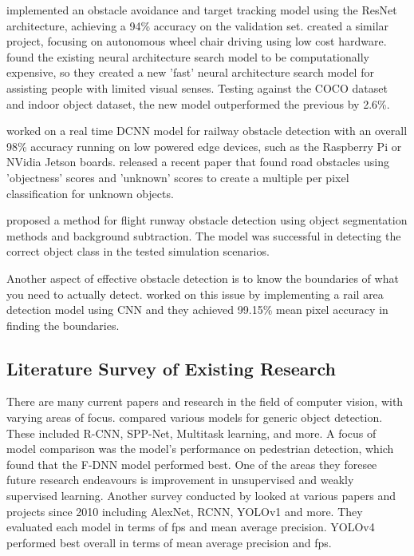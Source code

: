 \documentclass[stu,12pt,floatsintext]{apa7}
\begin{document}
\textcite{fang_computer_2021} implemented an obstacle avoidance and target tracking model using the ResNet architecture, achieving a 94\% accuracy on the validation set. \textcite{farheen_object_2022} created a similar project, focusing on autonomous wheel chair driving using low cost hardware. \textcite{said_obstacle_2023} found the existing neural architecture search model to be computationally expensive, so they created a new 'fast' neural architecture search model for assisting people with limited visual senses. Testing against the COCO dataset and indoor object dataset, the new model outperformed the previous by 2.6\%.

\textcite{jenefa_real-time_2023} worked on a real time DCNN model for railway obstacle detection with an overall 98\% accuracy running on low powered edge devices, such as the Raspberry Pi or NVidia Jetson boards. \textcite{noguchi_road_2024} released a recent paper that found road obstacles using 'objectness' scores and 'unknown' scores to create a multiple per pixel classification for unknown objects.

\textcite{andreev_runway_2021} proposed a method for flight runway obstacle detection using object segmentation methods and background subtraction. The model was successful in detecting the correct object class in the tested simulation scenarios. 

Another aspect of effective obstacle detection is to know the boundaries of what you need to actually detect. \textcite{wang_efficient_2018} worked on this issue by implementing a rail area detection model using CNN and they achieved 99.15\% mean pixel accuracy in finding the boundaries.

\subsection{Literature Survey of Existing Research}
There are many current papers and research in the field of computer vision, with varying areas of focus. \textcite{zhao_object_2019} compared various models for generic object detection. These included R-CNN, SPP-Net, Multitask learning, and more. A focus of model comparison was the model's performance on pedestrian detection, which found that the F-DNN model \parencite{du_fused_2017} performed best.
One of the areas they foresee future research endeavours is improvement in unsupervised and weakly supervised learning. Another survey conducted by \textcite{turay_toward_2022} looked at various papers and projects since 2010 including AlexNet, RCNN, YOLOv1 and more. They evaluated each model in terms of fps and mean average precision. YOLOv4 performed best overall in terms of mean average precision and fps.
\end{document}
